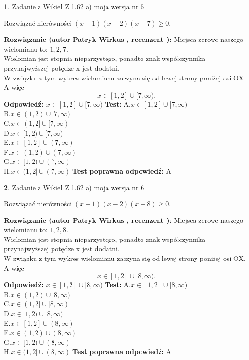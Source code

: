 \documentclass[12pt, a4paper]{article}
\theoremstyle{definition} %
\newtheorem{zad}{}
\newcommand{\zadStart}[1]{\begin{zad}#1\newline}
\newcommand{\zadStop}{\end{zad}}
\newcommand{\rozwStart}[2]{\noindent \textbf{Rozwiązanie (autor #1 , recenzent #2): }\newline}
\newcommand{\rozwStop}{\newline}
\newcommand{\odpStart}{\noindent \textbf{Odpowiedź:}\newline}
\newcommand{\odpStop}{\newline}
\newcommand{\testStart}{\noindent \textbf{Test:}\newline}
\newcommand{\testStop}{\newline}
\newcommand{\kluczStart}{\noindent \textbf{Test poprawna odpowiedź:}\newline}
\newcommand{\kluczStop}{\newline}
\begin{document}
\zadStart{Zadanie z Wikieł Z 1.62 a) moja wersja nr 5}

Rozwiązać nierówności $(x-1)(x-2)(x-7)\ge0$.
\zadStop
\rozwStart{Patryk Wirkus}{}
Miejsca zerowe naszego wielomianu to: $1, 2, 7$.\\
Wielomian jest stopnia nieparzystego, ponadto znak współczynnika przy\linebreak najwyższej potędze x jest dodatni.\\ W związku z tym wykres wielomianu zaczyna się od lewej strony poniżej osi OX. A więc $$x \in [1,2] \cup [7,\infty).$$
\rozwStop
\odpStart
$x \in [1,2] \cup [7,\infty)$
\odpStop
\testStart
A.$x \in [1,2] \cup [7,\infty)$\\
B.$x \in (1,2) \cup [7,\infty)$\\
C.$x \in (1,2] \cup [7,\infty)$\\
D.$x \in [1,2) \cup [7,\infty)$\\
E.$x \in [1,2] \cup (7,\infty)$\\
F.$x \in (1,2) \cup (7,\infty)$\\
G.$x \in [1,2) \cup (7,\infty)$\\
H.$x \in (1,2] \cup (7,\infty)$
\testStop
\kluczStart
A
\kluczStop



\zadStart{Zadanie z Wikieł Z 1.62 a) moja wersja nr 6}

Rozwiązać nierówności $(x-1)(x-2)(x-8)\ge0$.
\zadStop
\rozwStart{Patryk Wirkus}{}
Miejsca zerowe naszego wielomianu to: $1, 2, 8$.\\
Wielomian jest stopnia nieparzystego, ponadto znak współczynnika przy\linebreak najwyższej potędze x jest dodatni.\\ W związku z tym wykres wielomianu zaczyna się od lewej strony poniżej osi OX. A więc $$x \in [1,2] \cup [8,\infty).$$
\rozwStop
\odpStart
$x \in [1,2] \cup [8,\infty)$
\odpStop
\testStart
A.$x \in [1,2] \cup [8,\infty)$\\
B.$x \in (1,2) \cup [8,\infty)$\\
C.$x \in (1,2] \cup [8,\infty)$\\
D.$x \in [1,2) \cup [8,\infty)$\\
E.$x \in [1,2] \cup (8,\infty)$\\
F.$x \in (1,2) \cup (8,\infty)$\\
G.$x \in [1,2) \cup (8,\infty)$\\
H.$x \in (1,2] \cup (8,\infty)$
\testStop
\kluczStart
A
\kluczStop
\end{document}
